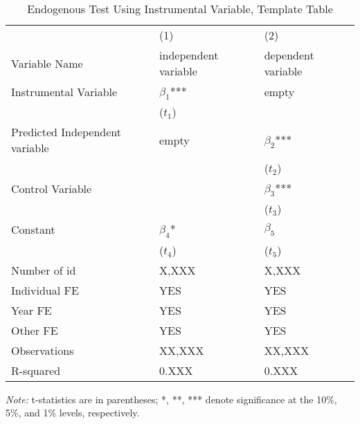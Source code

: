 \begin{table}[htbp]
    \caption{Endogenous Test Using Instrumental Variable, Template Table}
    \label{Use the regression name as the label}
    \centering
    \begin{tabular}{p{5cm}p{3cm}p{3cm}} %
    \toprule
    & (1) & (2) \\
    Variable Name  & independent variable  & dependent variable  \\
    \midrule
    Instrumental Variable   & $\beta_1$*** & empty \\
                & ($t_1$) &  \\
    Predicted Independent variable   & empty & $\beta_2$***\\
                &  & ($t_2$) \\
    Control Variable     &  & $\beta_3$*** \\  %
                &  & ($t_3$) \\
    Constant    & $\beta_4$* & $\beta_5$ \\
                & ($t_4$) & ($t_5$) \\
    
    Number of id       & X,XXX        & X,XXX \\
    Individual FE      & YES          & YES \\ %
    Year FE            & YES          & YES \\ %
    Other FE           & YES          & YES \\ %
    Observations       & XX,XXX       & XX,XXX \\
    R-squared          & 0.XXX        & 0.XXX \\
    \bottomrule
    \end{tabular}
    \begin{tablenotes}
    \small
    \item \textit{Note:} t-statistics are in parentheses; *, **, *** denote significance at the 10\%, 5\%, and 1\% levels, respectively.
    \end{tablenotes}
    \end{table}